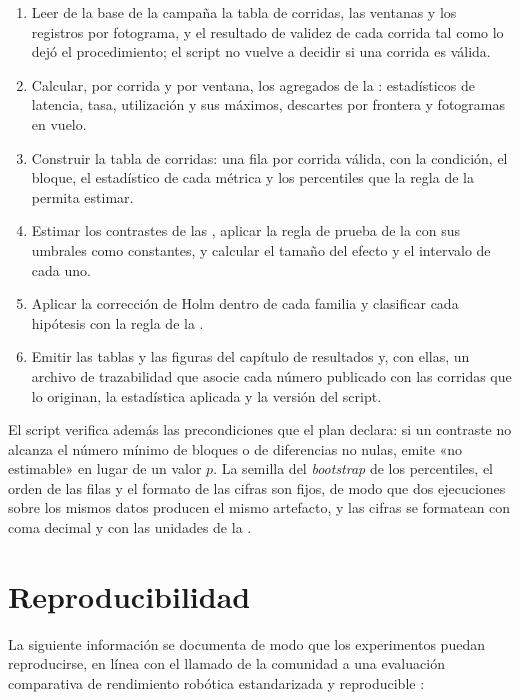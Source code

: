 \begin{enumerate}
  \item Leer de la base de la campaña la tabla de corridas, las ventanas y los
        registros por fotograma, y el resultado de validez de cada corrida tal
        como lo dejó el procedimiento; el script no vuelve a decidir si una
        corrida es válida.
  \item Calcular, por corrida y por ventana, los agregados de la
        : estadísticos de latencia, tasa,
        utilización y sus máximos, descartes por frontera y fotogramas en
        vuelo.
  \item Construir la tabla de corridas: una fila por corrida válida, con la
        condición, el bloque, el estadístico de cada métrica y los percentiles
        que la regla de la  permita estimar.
  \item Estimar los contrastes de las
        , aplicar la regla de prueba
        de la  con sus umbrales como constantes,
        y calcular el tamaño del efecto y el intervalo de cada uno.
  \item Aplicar la corrección de Holm dentro de cada familia y clasificar cada
        hipótesis con la regla de la .
  \item Emitir las tablas y las figuras del capítulo de resultados y, con
        ellas, un archivo de trazabilidad que asocie cada número publicado con
        las corridas que lo originan, la estadística aplicada y la versión del
        script.
\end{enumerate}

El script verifica además las precondiciones que el plan declara: si un
contraste no alcanza el número mínimo de bloques o de diferencias no nulas,
emite «no estimable» en lugar de un valor $p$. La semilla del \emph{bootstrap}
de los percentiles, el orden de las filas y el formato de las cifras son fijos,
de modo que dos
ejecuciones sobre los mismos datos producen el mismo artefacto, y las cifras se
formatean con coma decimal y con las unidades de la
.

\section{Reproducibilidad}
\label{sec:reproducibility}

La siguiente información se documenta de modo que los experimentos puedan
reproducirse, en línea con el llamado de la comunidad a una evaluación
comparativa de rendimiento robótica estandarizada y reproducible
\cite{mayoral-vilches2024}:

